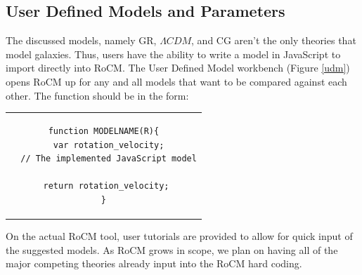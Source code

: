 \documentclass[conference]{IEEEtran-modified}
\begin{document}
\subsection{User Defined Models and Parameters}
The discussed models, namely GR, $\Lambda CDM$, and CG aren't the only theories that model galaxies. Thus, users have the ability to write a model in JavaScript to import directly into RoCM. The User Defined Model workbench (Figure \ref{udm}) opens RoCM up for any and all models that want to be compared against each other. The function should be in the form:
\begin{center}
\begin{tabular}{c}
\begin{lstlisting}
function MODELNAME(R){
  var rotation_velocity;
  // The implemented JavaScript model
	
  return rotation_velocity; 
}
\end{lstlisting}
\end{tabular}
\end{center}

On the actual RoCM tool, user tutorials are provided to allow for quick input of the suggested models.  As RoCM grows in scope, we plan on having all of the major competing theories already input into the RoCM hard coding.
\end{document}
